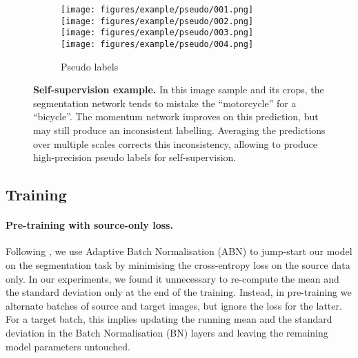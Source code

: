 \begin{figure*}[t]
\begin{subfigure}{.2\linewidth}
  \centering
    \texttt{[image: figures/example/pseudo/001.png]}\\
    \texttt{[image: figures/example/pseudo/002.png]}\\
    \texttt{[image: figures/example/pseudo/003.png]}\\
    \texttt{[image: figures/example/pseudo/004.png]}
  \caption{\scriptsize Pseudo labels}
  \label{fig:ex_fusion_pseudo}
\end{subfigure}
\caption{\textbf{Self-supervision example.} In this image sample \emph{} and its crops, the segmentation network \emph{} tends to mistake the ``motorcycle'' for a ``bicycle''.
The momentum network \emph{} improves on this prediction, but may still produce an inconsistent labelling.
Averaging the predictions over multiple scales \emph{} corrects this inconsistency, allowing to produce high-precision pseudo labels \emph{} for self-supervision.}
\label{fig:example_fusion}
\vspace{-0.6em}
\end{figure*}


\subsection{Training}
\label{sec:training}

\paragraph{Pre-training with source-only loss.}
Following \cite{LianDLG19,ZhangQYNL020}, we use Adaptive Batch Normalisation (ABN) \cite{LiWSHL18} to jump-start our model on the segmentation task by minimising the cross-entropy loss on the source data only.
In our experiments, we found it unnecessary to re-compute the mean and the standard deviation only at the end of the training.
Instead, in pre-training we alternate batches of source and target images, but ignore the loss for the latter.
For a target batch, this implies updating the running mean and the standard deviation in the Batch Normalisation (BN) \cite{IoffeS15} layers and leaving the remaining model parameters untouched.

